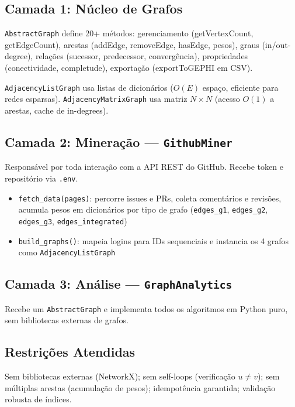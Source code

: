 \documentclass[12pt,a4paper]{article}
\begin{document}
\subsection{Camada 1: Núcleo de Grafos}

\texttt{AbstractGraph} define 20+ métodos: gerenciamento (getVertexCount, getEdgeCount), arestas (addEdge, removeEdge, hasEdge, pesos), graus (in/out-degree), relações (sucessor, predecessor, convergência), propriedades (conectividade, completude), exportação (exportToGEPHI em CSV).

\texttt{AdjacencyListGraph} usa listas de dicionários ($O(E)$ espaço, eficiente para redes esparsas). \texttt{AdjacencyMatrixGraph} usa matriz $N \times N$ (acesso $O(1)$ a arestas, cache de in-degrees).

\subsection{Camada 2: Mineração — \texttt{GithubMiner}}

Responsável por toda interação com a API REST do GitHub. Recebe token e repositório via \texttt{.env}.

\begin{itemize}
  \item \texttt{fetch\_data(pages)}: percorre issues e PRs, coleta comentários e revisões, acumula pesos em dicionários por tipo de grafo (\texttt{edges\_g1}, \texttt{edges\_g2}, \texttt{edges\_g3}, \texttt{edges\_integrated})
  \item \texttt{build\_graphs()}: mapeia logins para IDs sequenciais e instancia os 4 grafos como \texttt{AdjacencyListGraph}
\end{itemize}

\subsection{Camada 3: Análise — \texttt{GraphAnalytics}}

Recebe um \texttt{AbstractGraph} e implementa todos os algoritmos em Python puro, sem bibliotecas externas de grafos.

\subsection{Restrições Atendidas}

Sem bibliotecas externas (NetworkX); sem self-loops (verificação $u \neq v$); sem múltiplas arestas (acumulação de pesos); idempotência garantida; validação robusta de índices.
\end{document}
